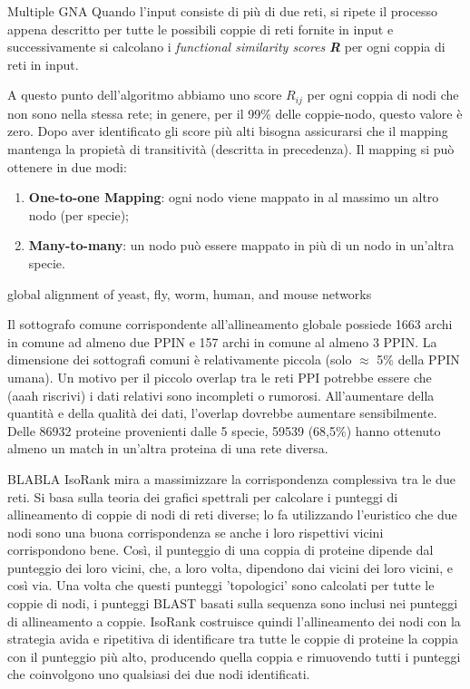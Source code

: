 \documentclass[11pt]{article}
\begin{document}
Multiple GNA
Quando l'input consiste di più di due reti, si ripete il processo appena descritto per tutte le possibili coppie di reti fornite in input e successivamente si calcolano i \textit{functional similarity scores} \textit{\textbf{R}} per ogni coppia di reti in input.

A questo punto dell'algoritmo abbiamo uno score $R_{ij}$ per ogni coppia di nodi che non sono nella stessa rete; in genere, per il 99\% delle coppie-nodo, questo valore è zero. Dopo aver identificato gli score più alti bisogna assicurarsi che il mapping mantenga la propietà di transitività (descritta in precedenza). Il mapping si può ottenere in due modi: 
\begin{enumerate}
\setlength{\itemsep}{1pt}
  \setlength{\parskip}{0pt}
  \setlength{\parsep}{0pt}
\item \textbf{One-to-one Mapping}: ogni nodo viene mappato in al massimo un altro nodo (per specie);
\item \textbf{Many-to-many}: un nodo può essere mappato in più di un nodo in un'altra specie.
\end{enumerate}

global alignment of yeast, fly, worm, human, and mouse networks

Il sottografo comune corrispondente all'allineamento globale possiede 1663 archi in comune ad almeno due PPIN e 157 archi in comune al almeno 3 PPIN. La dimensione dei sottografi comuni è relativamente piccola (solo $\approx$ 5\% della PPIN umana). Un motivo per il piccolo overlap tra le reti PPI potrebbe essere che (aaah riscrivi) i dati relativi sono incompleti o rumorosi. All'aumentare della quantità e della qualità dei dati, l'overlap dovrebbe aumentare sensibilmente. Delle 86932 proteine provenienti dalle 5 specie, 59539 (68,5\%) hanno ottenuto almeno un match in un'altra proteina di una rete diversa.


BLABLA
IsoRank mira a massimizzare la corrispondenza complessiva tra le due reti. Si basa sulla teoria dei grafici spettrali per calcolare i punteggi di allineamento di coppie di nodi di reti diverse; lo fa utilizzando l'euristico che due nodi sono una buona corrispondenza se anche i loro rispettivi vicini corrispondono bene. Così, il punteggio di una coppia di proteine dipende dal punteggio dei loro vicini, che, a loro volta, dipendono dai vicini dei loro vicini, e così via.
Una volta che questi punteggi 'topologici' sono calcolati per tutte le coppie di nodi, i punteggi BLAST basati sulla sequenza sono inclusi nei punteggi di allineamento a coppie. IsoRank costruisce quindi l'allineamento dei nodi con la strategia avida e ripetitiva di identificare tra tutte le coppie di proteine la coppia con il punteggio più alto, producendo quella coppia e rimuovendo tutti i punteggi che coinvolgono uno qualsiasi dei due nodi identificati.
\end{document}
